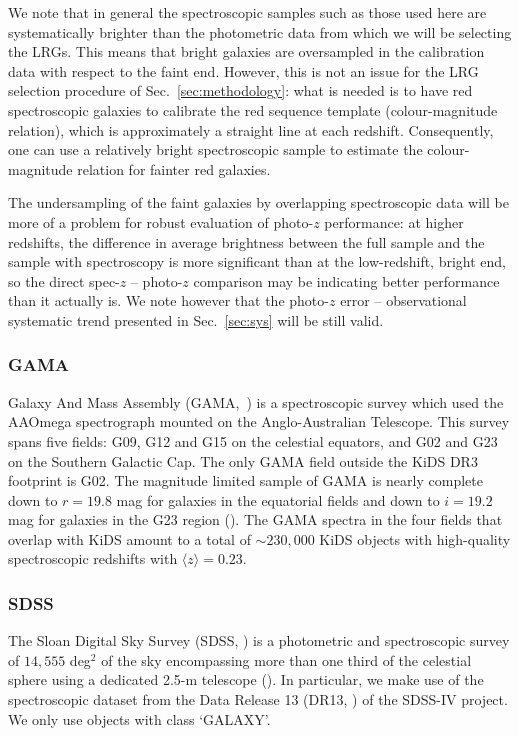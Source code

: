 \documentclass[fleqn,usenatbib,useAMS]{mnras}
\begin{document}
We note that in general the spectroscopic samples such as those used here are systematically  brighter than the photometric data from which we will be selecting the LRGs. This means that bright galaxies are oversampled in the calibration data with respect to the faint end. However, this is not an issue for the LRG selection procedure of Sec.~\ref{sec:methodology}: what is needed is to have red spectroscopic galaxies to calibrate the red sequence template (colour-magnitude relation), which is approximately a straight line at each redshift. Consequently, one can use a relatively bright spectroscopic sample to estimate the colour-magnitude relation for fainter red galaxies.

The undersampling of the faint galaxies by overlapping spectroscopic data will be more of a problem for robust evaluation of photo-$z$ performance: at higher redshifts, the difference in average brightness between the full sample and the sample with spectroscopy is more significant than at the low-redshift, bright end, so the direct spec-$z$ -- photo-$z$ comparison may be indicating better performance than it actually is. We note however that the photo-$z$ error -- observational systematic trend presented in Sec.~\ref{sec:sys} will be still valid.

\subsubsection{GAMA}
Galaxy And Mass Assembly (GAMA,~\citealt{driver2011}) is a spectroscopic survey  which used the AAOmega spectrograph mounted on the Anglo-Australian Telescope. This survey spans five fields: G09, G12 and G15 on the celestial equators, and G02 and G23 on the Southern Galactic Cap. The only GAMA field outside the KiDS DR3 footprint is G02. The magnitude limited sample of GAMA is nearly complete down to $r=19.8$ mag for galaxies in the equatorial fields and down to $i=19.2$ mag for galaxies in the G23 region (\citealt{likse2015}). The GAMA spectra in the four fields that overlap with KiDS amount to a total of $\sim 230,000$ KiDS objects with high-quality spectroscopic redshifts with $\langle z \rangle = 0.23$. 

\subsubsection{SDSS}

The Sloan Digital Sky Survey (SDSS, \citealt{york2000}) is a photometric and spectroscopic survey of $14,555$ deg$^2$ of the sky encompassing more than one third of the celestial sphere using a dedicated 2.5-m telescope (\citealt{gunn2006}). In particular, we make use of the spectroscopic dataset from the Data Release 13 (DR13, \citealt{sdss_dr13}) of the SDSS-IV project. We only use objects with class `GALAXY'. 
\end{document}
